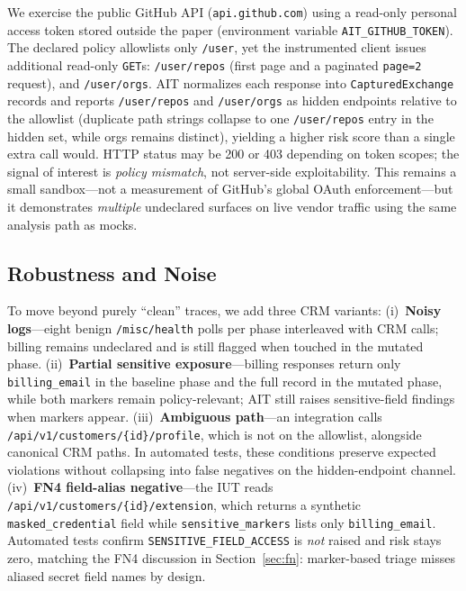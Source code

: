 \documentclass[conference]{IEEEtran}
\begin{document}
We exercise the public GitHub API (\texttt{api.github.com}) using a
read-only personal access token stored outside the paper (environment
variable \texttt{AIT\_GITHUB\_TOKEN}). The declared policy allowlists
only \texttt{/user}, yet the instrumented client issues additional
read-only \texttt{GET}s: \texttt{/user/repos} (first page and a
paginated \texttt{page=2} request), and \texttt{/user/orgs}. AIT
normalizes each response into \texttt{CapturedExchange} records and
reports \texttt{/user/repos} and \texttt{/user/orgs} as hidden endpoints
relative to the allowlist (duplicate path strings collapse to one
\texttt{/user/repos} entry in the hidden set, while orgs remains
distinct), yielding a higher risk score than a single extra call would.
HTTP status may be 200 or 403 depending on token scopes; the signal of
interest is \emph{policy mismatch}, not server-side exploitability.
This remains a small sandbox---not a measurement of GitHub's global OAuth
enforcement---but it demonstrates \emph{multiple} undeclared surfaces on
live vendor traffic using the same analysis path as mocks.

\subsection{Robustness and Noise}
\label{sec:robust}

To move beyond purely ``clean'' traces, we add three CRM variants:
(i)~\textbf{Noisy logs}---eight benign \texttt{/misc/health} polls per
phase interleaved with CRM calls; billing remains undeclared and is
still flagged when touched in the mutated phase.
(ii)~\textbf{Partial sensitive exposure}---billing responses return only
\texttt{billing\_email} in the baseline phase and the full record in the
mutated phase, while both markers remain policy-relevant; AIT still
raises sensitive-field findings when markers appear.
(iii)~\textbf{Ambiguous path}---an integration calls
\texttt{/api/v1/customers/\{id\}/profile}, which is not on the
allowlist, alongside canonical CRM paths. In automated tests, these
conditions preserve expected violations without collapsing into false
negatives on the hidden-endpoint channel.
(iv)~\textbf{FN4 field-alias negative}---the IUT reads
\texttt{/api/v1/customers/\{id\}/extension}, which returns a synthetic
\texttt{masked\_credential} field while \texttt{sensitive\_markers}
lists only \texttt{billing\_email}. Automated tests confirm
\texttt{SENSITIVE\_FIELD\_ACCESS} is \emph{not} raised and risk stays
zero, matching the FN4 discussion in Section~\ref{sec:fn}: marker-based
triage misses aliased secret field names by design.
\end{document}
